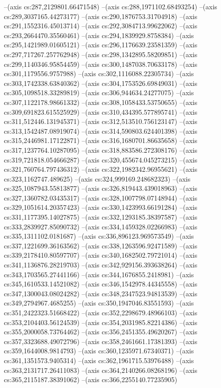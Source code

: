 --(axis cs:287,2129801.66471548)
--(axis cs:288,1971102.68493254)
--(axis cs:289,3037165.44273177)
--(axis cs:290,1876753.31704918)
--(axis cs:291,1552316.45013714)
--(axis cs:292,3084713.99622062)
--(axis cs:293,2664470.35560461)
--(axis cs:294,1839929.8758384)
--(axis cs:295,1421989.01605121)
--(axis cs:296,1176639.23581359)
--(axis cs:297,717267.257762948)
--(axis cs:298,1342895.58209851)
--(axis cs:299,1140346.95854459)
--(axis cs:300,1487038.70633178)
--(axis cs:301,1179556.9757988)
--(axis cs:302,1116088.22305734)
--(axis cs:303,1742338.63840362)
--(axis cs:304,1753526.69849031)
--(axis cs:305,1098518.33289819)
--(axis cs:306,944634.24277075)
--(axis cs:307,1122178.98661332)
--(axis cs:308,1058433.53750655)
--(axis cs:309,691823.615525929)
--(axis cs:310,434395.577895741)
--(axis cs:311,512446.131945371)
--(axis cs:312,513510.756123147)
--(axis cs:313,1542487.08919074)
--(axis cs:314,590803.624401398)
--(axis cs:315,2446981.17122871)
--(axis cs:316,1680701.86635658)
--(axis cs:317,1237764.10287095)
--(axis cs:318,883586.272308176)
--(axis cs:319,721818.054666287)
--(axis cs:320,455674.045273215)
--(axis cs:321,760764.797436312)
--(axis cs:322,1982342.96955621)
--(axis cs:323,1162747.489625)
--(axis cs:324,999169.248682323)
--(axis cs:325,1087943.55813877)
--(axis cs:326,819443.439018963)
--(axis cs:327,1360782.03435317)
--(axis cs:328,1007798.07148944)
--(axis cs:329,1051614.20357423)
--(axis cs:330,1423993.66191284)
--(axis cs:331,1177395.14027875)
--(axis cs:332,1293185.38397587)
--(axis cs:333,2839927.85090732)
--(axis cs:334,1459328.02266983)
--(axis cs:335,1311102.0181687)
--(axis cs:336,896123.969573549)
--(axis cs:337,1221699.36163562)
--(axis cs:338,1263596.92471589)
--(axis cs:339,2178410.80597707)
--(axis cs:340,1682502.79721014)
--(axis cs:341,1136876.28219703)
--(axis cs:342,929156.393638264)
--(axis cs:343,1703565.27441166)
--(axis cs:344,1676855.2418981)
--(axis cs:345,1610533.14521082)
--(axis cs:346,1542978.44345558)
--(axis cs:347,1300043.08024282)
--(axis cs:348,2347523.94813539)
--(axis cs:349,2794967.4685255)
--(axis cs:350,1947046.83551593)
--(axis cs:351,2422323.51668422)
--(axis cs:352,2298679.48966103)
--(axis cs:353,2104403.56124539)
--(axis cs:354,2031985.82214386)
--(axis cs:355,2000058.73764462)
--(axis cs:356,2451355.49620267)
--(axis cs:357,3323688.49072796)
--(axis cs:358,2461661.17381393)
--(axis cs:359,1644008.9814793)
--(axis cs:360,1235971.67340371)
--(axis cs:361,1351573.9405314)
--(axis cs:362,1961715.53976488)
--(axis cs:363,2131717.26411083)
--(axis cs:364,2140266.08268196)
--(axis cs:365,2115187.38391062)
--(axis cs:366,2255140.77235905)
